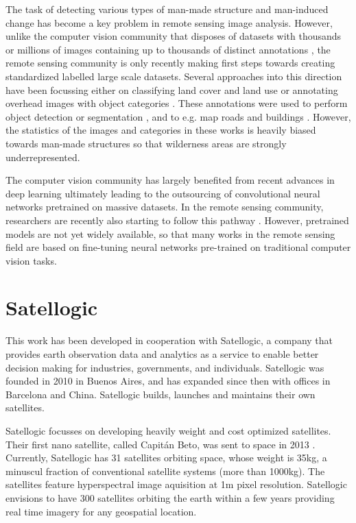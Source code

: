 The task of detecting various types of man-made structure and man-induced change has become a key problem in remote sensing image analysis. However, unlike the computer vision community that disposes of datasets with thousands or millions of images containing up to thousands of distinct annotations \parencite{everingham2010, deng2009, lin2014, krasin2016}, the remote sensing community is only recently making first steps towards creating standardized labelled large scale datasets. Several approaches into this direction have been focussing either on classifying land cover and land use \parencite{sumbul2019} or annotating overhead images with object categories \parencite{vanetten2018, lam2018}. These annotations were used to perform object detection or segmentation \parencite{yang2010, krasin2016}, and to e.g. map roads and buildings \parencite{vanetten2018, vanetten2019}. However, the statistics of the images and categories in these works is heavily biased towards man-made structures so that wilderness areas are strongly underrepresented. 

The computer vision community has largely benefited from recent advances in deep learning ultimately leading to the outsourcing of convolutional neural networks pretrained on massive datasets. In the remote sensing community, researchers are recently also starting to follow this pathway \parencite{sumbul2019}. However, pretrained models are not yet widely available, so that many works in the remote sensing field are based on fine-tuning neural networks  pre-trained on traditional computer vision tasks.

\section{Satellogic}
This work has been developed in cooperation with Satellogic, a company that provides earth observation data and analytics as a service to enable better decision making for industries, governments, and individuals. Satellogic was founded in 2010 in Buenos Aires, and has expanded since then with offices in Barcelona and China. Satellogic builds, launches and maintains their own satellites.

Satellogic focusses on developing heavily weight and cost optimized satellites. Their first nano satellite, called Capitán Beto, was sent to space in 2013 \parencite{wiki_satellogic}. Currently, Satellogic has 31 satellites orbiting space, whose weight is 35kg, a minuscul fraction of conventional satellite systems (more than 1000kg). The satellites feature hyperspectral image aquisition at 1m pixel resolution. Satellogic envisions to have 300 satellites orbiting the earth within a few years providing real time imagery for any geospatial location. 

